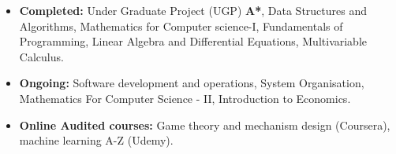 

\begin{itemize}
\item {\small{\textbf{Completed:} Under Graduate Project (UGP) \textbf{A*}, Data Structures and Algorithms, Mathematics for Computer
science-I, Fundamentals of Programming, Linear Algebra and Differential Equations, Multivariable Calculus.}}
\item {\small{\textbf{Ongoing:} Software development and operations, System Organisation, Mathematics For Computer Science - II, Introduction to Economics.}}
\item {\small{\textbf{Online Audited courses:} Game theory and mechanism design (Coursera), machine learning A-Z (Udemy).}}
\end{itemize}